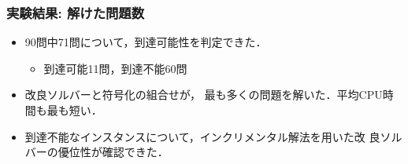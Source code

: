 \begin{frame}\frametitle{実験結果: 解けた問題数}

  \begin{exampleblock}{}
    \centering
    \renewcommand{\arraystretch}{1.2}
    \scalebox{0.9}{}
  \end{exampleblock}

  \begin{itemize}
  \item 90問中71問について，到達可能性を判定できた．
    \begin{itemize}
    \item 到達可能11問，到達不能60問
    \end{itemize}
  \item 改良ソルバーと符号化の組合せが，
    最も多くの問題を解いた．平均CPU時間も最も短い．
  \item 到達不能なインスタンスについて，インクリメンタル解法を用いた改
    良ソルバーの優位性が確認できた．
  \end{itemize}
\end{frame}
